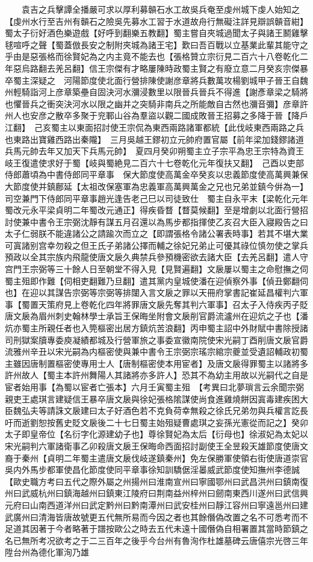 　　袁吉之兵擊譚全播嚴可求以厚利募贑石水工故吳兵奄至虔州城下虔人始知之【虔州水行至吉州有贑石之險吳先募水工習于水道故舟行無礙注詳見辯誤贑音紺】　蜀太子衍好酒色樂遊戲【好呼到翻樂五教翻】蜀主嘗自夾城過聞太子與諸王鬭雞擊毬喧呼之聲【蜀蓋倣長安之制附夾城為諸王宅】歎曰吾百戰以立基業此輩其能守之乎由是惡張格而徐賢妃為之内主竟不能去也【張格贊立宗衍見二百六十八卷乾化二年惡烏路翻去羌呂翻】信王宗傑有才略屢陳時政蜀主賢之有廢立意二月癸亥宗傑暴卒蜀主深疑之　河陽節度使北面行營排陳使謝彦章將兵數萬攻楊劉城甲子晉王自魏州輕騎詣河上彦章築壘自固決河水瀰浸數里以限晉兵晉兵不得進【謝彥章梁之騎將也懼晉兵之衝突決河水以限之幽并之突騎非南兵之所能敵自古然也瀰音彌】彦章許州人也安彦之散卒多聚于兖鄆山谷為羣盜以觀二國成敗晉王招募之多降于晉【降戶江翻】　己亥蜀主以東面招討使王宗侃為東西兩路諸軍都統【此伐岐東西兩路之兵也東路出寶雞西路出秦隴】　三月吳越王鏐初立元帥府置官屬【前年梁加錢鏐諸道兵馬元帥去年又加天下兵馬元帥】　夏四月癸卯朔蜀主立子宗平為忠王宗特為資王　岐王復遣使求好于蜀【岐與蜀絶見二百六十七卷乾化元年復扶又翻】　己酉以吏部侍郎蕭頃為中書侍郎同平章事　保大節度使高萬金卒癸亥以忠義節度使高萬興兼保大節度使并鎮鄜延【太祖改保塞軍為忠義軍高萬興萬金之兄也兄弟並鎮今倂為一】　司空兼門下侍郎同平章事趙光逢告老己巳以司徒致仕　蜀主自永平末【梁乾化元年蜀改元永平梁貞明二年蜀改元通正】得疾昏瞀【瞀莫候翻】至是增劇以北面行營招討使兼中書令王宗弼沈靜有謀五月召還以為馬步都指揮使乙亥召大臣入寢殿告之曰太子仁弱朕不能違諸公之請踰次而立之【即謂張格令諸公署表時事】若其不堪大業可寘諸别宫幸勿殺之但王氏子弟諸公擇而輔之徐妃兄弟止可優其祿位慎勿使之掌兵預政以全其宗族内飛龍使唐文扆久典禁兵參預機密欲去諸大臣【去羌呂翻】遣人守宫門王宗弼等三十餘人日至朝堂不得入見【見賢遍翻】文扆屢以蜀主之命慰撫之伺蜀主殂即作難【伺相吏翻難乃旦翻】遣其黨内皇城使潘在迎偵察外事【偵丑鄭翻伺也】在迎以其謀告宗弼等宗弼等排闥入言文扆之罪以天冊府掌書記崔延昌權判六軍事【蜀置天策府見上卷乾化四年將罪唐文扆先奪其判六軍事】召太子入侍疾丙子貶唐文扆為眉州刺史翰林學士承旨王保晦坐附會文扆削官爵流瀘州在迎炕之子也【潘炕亦蜀主所親任者也入筦樞密出居方鎮炕苦浪翻】丙申蜀主詔中外財賦中書除授諸司刑獄案牘專委庾凝績都城及行營軍旅之事委宣徽南院使宋光嗣丁酉削唐文扆官爵流雅州辛丑以宋光嗣為内樞密使與兼中書令王宗弼宗瑤宗綰宗夔並受遺詔輔政初蜀主雖因唐制置樞密使專用士人【唐制樞密使本用宦者】及唐文扆得罪蜀主以諸將多許州故人【蜀主本許州舞陽人其諸將亦多許人】恐其不為幼主用故以光嗣代之自是宦者始用事【為蜀以宦者亡張本】六月壬寅蜀主殂　【考異曰北夢瑣言云余聞宗弼親吏王處琪言建疑信王暴卒唐文扆與徐妃張格隂謀使尚食進雞燒餅因寘毒建疾困大臣魏弘夫等請誅文扆建曰太子好酒色若不克負荷幸無殺之徐氏兄弟勿與兵權言訖長吁而逝劉恕按舊史貶文扆後二十七日蜀主始殂疑曹處琪之妄孫光憲從而記之】癸卯太子即皇帝位【名衍字化源建幼子也】尊徐賢妃為太后【衍母也】徐淑妃為太妃以宋光嗣判六軍諸衛事乙卯殺唐文扆王保晦命西面招討副使王全昱殺天雄節度使唐文裔于秦州【貞明二年蜀主遣唐文扆伐岐遂鎮秦州】免左保勝軍使領右街使唐道崇官　吳内外馬步都軍使昌化節度使同平章事徐知訓驕倨淫㬥威武節度使知撫州李德誠【歐史職方考曰五代之際外屬之州揚州曰淮南宣州曰寧國鄂州曰武昌洪州曰鎮南復州曰武威杭州曰鎮海越州曰鎮東江陵府曰荆南益州梓州曰劒南東西川遂州曰武信興元府曰山南西道洋州曰武定黔州曰黔南潭州曰武安桂州曰靜江容州曰寧遠邕州曰建武廣州曰清海皆唐故號更五代無所易而今因之者也其餘僭偽改置之名不可悉考而不足道其因著于今者略著于譜按歐公之時去五代未遠十國僭偽自相署置其當時節鎮之名已無所考况欲考之于二三百年之後乎今台州有魯洵作杜雄墓碑云唐僖宗光啓三年陞台州為德化軍洵乃雄